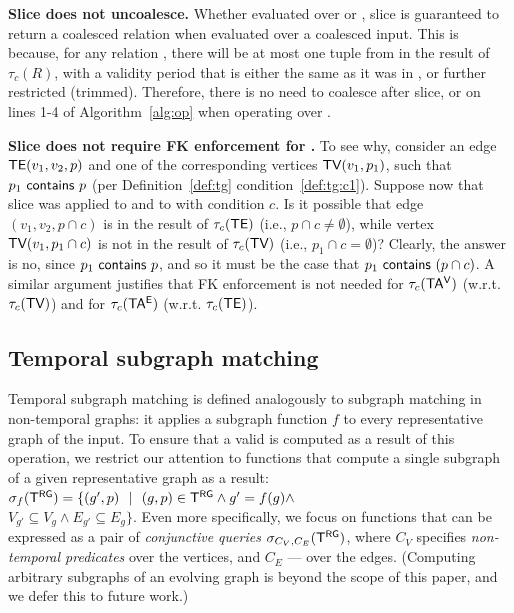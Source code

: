 

{\bf Slice does not uncoalesce.} Whether evaluated over \trg or \tve,
slice is guaranteed to return a coalesced relation when evaluated over
a coalesced input.  This is because, for any relation , there
will be at most one tuple from  in the result of $\tau_c (R)$,
with a validity period that is either the same as it was in ,
or further restricted (trimmed).  Therefore, there is no need to
coalesce \trg after slice, or on lines 1-4 of Algorithm~\ref{alg:op}
when operating over \tve.

{\bf Slice does not require FK enforcement for \tve.}  To see why,
consider an edge $\textsf{TE}(v_1, v_2, p)$ and one of the corresponding
vertices $\textsf{TV}(v_1, p_1)$, such that $p_1~\mathsf{contains}~p$ (per
Definition~\ref{def:tg} condition~\ref{def:tg:c1}).  Suppose now that
slice was applied to \tv and to \te with condition $c$.  Is it
possible that edge $(v_1, v_2, p \cap c)$ is in the result of $\tau_c
(\textsf{TE})$ (i.e., $p \cap c \neq \emptyset$), while vertex $\textsf{TV}(v_1, p_1 \cap
c)$ is not in the result of $\tau_c (\textsf{TV})$ (i.e., $p_1 \cap c =
\emptyset$)?  Clearly, the answer is no, since
$p_1~\mathsf{contains}~p$, and so it must be the case that
$p_1~\mathsf{contains}~(p \cap c)$.  A similar argument justifies that
FK enforcement is not needed for $\tau_c(\mathsf{TA^{V}})$ (w.r.t. $\tau_c (\textsf{TV})$) and
for $\tau_c(\mathsf{TA^{E}})$ (w.r.t. $\tau_c (\textsf{TE})$).

\subsection{Temporal subgraph matching}
\label{sec:algebra:subgraph}

Temporal subgraph matching is defined analogously to subgraph matching
in non-temporal graphs: it applies a subgraph function $f$ to every
representative graph of the input.  To ensure that a valid \tg is
computed as a result of this operation, we restrict our attention to
functions that compute a single subgraph of a given representative
graph as a result: $\sigma_f (\mathsf{T^{RG}}) = \{ (g', p)~~|~~(g, p) \in \mathsf{T^{RG}}
\wedge g' = f(g) \wedge$\\$V_{g'} \subseteq V_{g} \wedge E_{g'}
\subseteq E_{g} \}$. Even more specifically, we focus on functions
that can be expressed as a pair of {\em conjunctive queries}
$\sigma_{C_V,C_E} (\mathsf{T^{RG}})$, where $C_V$ specifies {\em non-temporal
  predicates} over the vertices, and $C_E$ --- over the
edges. (Computing arbitrary subgraphs of an evolving graph is beyond
the scope of this paper, and we defer this to future work.)

